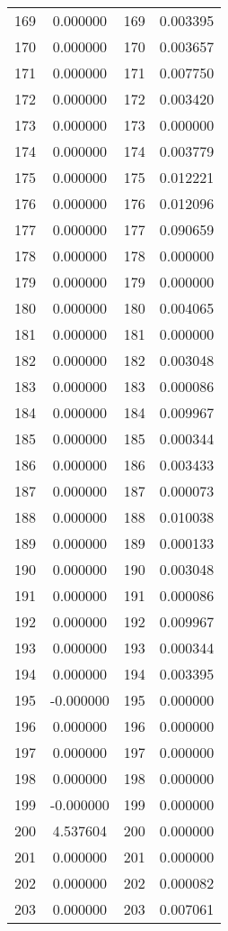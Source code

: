 \documentclass[12pt]{article}
\begin{document}
\begin{longtable}{@{}cccc@{}}
169 & 0.000000 & 169 & 0.003395 \\
170 & 0.000000 & 170 & 0.003657 \\
171 & 0.000000 & 171 & 0.007750 \\
172 & 0.000000 & 172 & 0.003420 \\
173 & 0.000000 & 173 & 0.000000 \\
174 & 0.000000 & 174 & 0.003779 \\
175 & 0.000000 & 175 & 0.012221 \\
176 & 0.000000 & 176 & 0.012096 \\
177 & 0.000000 & 177 & 0.090659 \\
178 & 0.000000 & 178 & 0.000000 \\
179 & 0.000000 & 179 & 0.000000 \\
180 & 0.000000 & 180 & 0.004065 \\
181 & 0.000000 & 181 & 0.000000 \\
182 & 0.000000 & 182 & 0.003048 \\
183 & 0.000000 & 183 & 0.000086 \\
184 & 0.000000 & 184 & 0.009967 \\
185 & 0.000000 & 185 & 0.000344 \\
186 & 0.000000 & 186 & 0.003433 \\
187 & 0.000000 & 187 & 0.000073 \\
188 & 0.000000 & 188 & 0.010038 \\
189 & 0.000000 & 189 & 0.000133 \\
190 & 0.000000 & 190 & 0.003048 \\
191 & 0.000000 & 191 & 0.000086 \\
192 & 0.000000 & 192 & 0.009967 \\
193 & 0.000000 & 193 & 0.000344 \\
194 & 0.000000 & 194 & 0.003395 \\
195 & -0.000000 & 195 & 0.000000 \\
196 & 0.000000 & 196 & 0.000000 \\
197 & 0.000000 & 197 & 0.000000 \\
198 & 0.000000 & 198 & 0.000000 \\
199 & -0.000000 & 199 & 0.000000 \\
200 & 4.537604 & 200 & 0.000000 \\
201 & 0.000000 & 201 & 0.000000 \\
202 & 0.000000 & 202 & 0.000082 \\
203 & 0.000000 & 203 & 0.007061 \\

\end{longtable}
\end{document}
